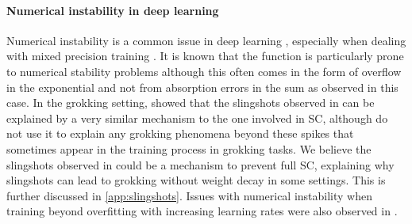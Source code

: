 \paragraph{Numerical instability in deep learning} 
Numerical instability is a common issue in deep learning \cite{stability}, especially when dealing with mixed precision training \cite{andriushchenko2023needweightdecaymodern}. It is known that the \softmax function is particularly prone to numerical stability problems although this often comes in the form of overflow in the exponential \citep{stability} and not from absorption errors in the sum as observed in this case. In the grokking setting, \cite{Nanda2023-hf} showed that the slingshots observed in \cite{slingshot-mechanism} can be explained by a very similar mechanism to the one involved in SC, although \cite{Nanda2023-hf} do not use it to explain any grokking phenomena beyond these spikes that sometimes appear in the training process in grokking tasks. We believe the slingshots observed in \cite{slingshot-mechanism} could be a mechanism to prevent full SC, explaining why slingshots can lead to grokking without weight decay in some settings. This is further discussed in \cref{app:slingshots}. Issues with numerical instability when training beyond overfitting with increasing learning rates were also observed in \cite{Lyu2019-sc}.

\begin{comment}
    

Emergent abilities~\citep{huang2024unified}
\citet{power2022grokking} 
modular addition~\cite{} and multiplication~\cite{doshi2024grokking}
\cite{wang2024grokked} find that transformers can learn implicit reasoning, but only through grokking.
\cite{fan2024deep} reveal that deep neural networks can be more susceptible to grokking than its shallower counterparts. This is supported by \cite{humayun2024deep} arguing that deep networks always grok. These findings make the extent of our study even more interesting for practical settings. 
phase transition from lazy to rich regime~\citep{kumar2023grokking,mohamadi2024you,Lyu2023-ga,rubin2023droplets}, learning local rules~\cite{vzunkovivc2024grokking}.
phase transition and emergence~\citep{clauw2024information}, formation of geometric arrangement of circuits in the input space~\cite{humayun2024grokking}
Group theoretic~\cite{stander2023grokking,chughtai2023toy}

compression and robustness~\cite{liu2023grokking,tan2023understanding}: weight norm (metric) of the neural network is actually a
sufficient condition for grokking

\end{comment}

